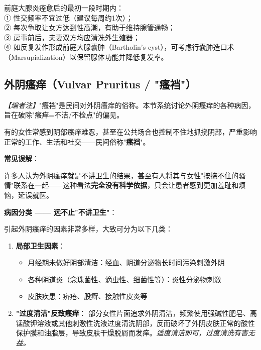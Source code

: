 \begin{enumerate}
\begin{tcolorbox}[colback=pink!5!white,colframe=red!50!black,title=贴心小叮咛]
前庭大腺炎痊愈后的最初一段时期内：\\
① 性交频率不宜过低（建议每周约1次）；\\
② 每次争取让女方达到性高潮，有助于维持腺管通畅；\\
③ 房事前后，夫妻双方均应清洗外生殖器；\\
④ 如反复发作形成前庭大腺囊肿（Bartholin's cyst），可考虑行囊肿造口术（Marsupialization）以保留腺体功能并降低复发率。
\end{tcolorbox}
\subsection{外阴瘙痒（Vulvar Pruritus / "瘙裆"）}

\noindent\textit{【编者注】}"瘙裆"是民间对外阴瘙痒的俗称。本节系统讨论外阴瘙痒的各种病因，旨在破除"瘙痒=不洁/不检点"的偏见。

\vspace{0.5em}
有的女性常感到阴部瘙痒难忍，甚至在公共场合也控制不住地抓挠阴部，严重影响正常的工作、生活和社交——民间俗称"\textbf{瘙裆}"。

\vspace{0.5em}
\noindent\textbf{常见误解}：

许多人认为外阴瘙痒就是不讲卫生的结果，甚至有人将其与女性"按捺不住的骚情"联系在一起——这种看法\textbf{完全没有科学依据}，只会让患者感到更加羞耻和烦恼，延误就医。

\vspace{0.5em}
\noindent\textbf{病因分类 —— 远不止"不讲卫生"}：

引起外阴瘙痒的因素非常多样，大致可分为以下几类：

\begin{enumerate}
	\item \textbf{局部卫生因素}：
	\begin{itemize}
		\item 月经期未做好阴部清洁：经血、阴道分泌物长时间污染刺激外阴
		\item 各种阴道炎（念珠菌性、滴虫性、细菌性等）：炎性分泌物刺激
		\item 皮肤疾患：疥疮、股癣、接触性皮炎等
	\end{itemize}

	\item \textbf{"过度清洁"反致瘙痒}：
	部分女性片面追求外阴清洁，频繁使用强碱性肥皂、高锰酸钾溶液或其他刺激性洗液过度清洗阴部，反而破坏了外阴皮肤正常的酸性保护膜和油脂层，导致皮肤干燥脱屑而发痒。\textit{适度清洁即可，过度清洗有害无益。}


\end{enumerate}
\end{enumerate}
